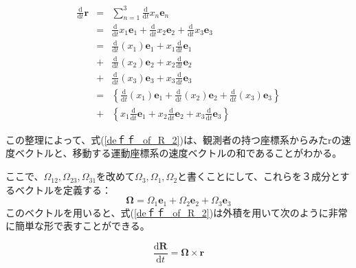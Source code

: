 \documentclass[twocolumn,a4j,10pt]{jarticle}
\begin{document}
\begin{eqnarray}
  \frac{\mathrm{d}}{\mathrm{d} t} \bm{r} &=& \sum_{n=1}^{3} \frac{\mathrm{d}}{\mathrm{d} t} x_n \bm{e}_n \nonumber \\
  &=& \frac{\mathrm{d}}{\mathrm{d} t} x_1 \bm{e}_1
      + \frac{\mathrm{d}}{\mathrm{d} t} x_2 \bm{e}_2
      + \frac{\mathrm{d}}{\mathrm{d} t} x_3 \bm{e}_3 \nonumber \\
  &=& \frac{\mathrm{d}}{\mathrm{d} t} (x_1) \bm{e}_1 + x_1 \frac{\mathrm{d}}{\mathrm{d} t} \bm{e}_1 \nonumber \\
  &+& \frac{\mathrm{d}}{\mathrm{d} t} (x_2) \bm{e}_2 + x_2 \frac{\mathrm{d}}{\mathrm{d} t} \bm{e}_2 \nonumber \\
  &+& \frac{\mathrm{d}}{\mathrm{d} t} (x_3) \bm{e}_3 + x_3 \frac{\mathrm{d}}{\mathrm{d} t} \bm{e}_3 \nonumber \\
  &=& \left\{ \frac{\mathrm{d}}{\mathrm{d} t} (x_1) \bm{e}_1 + \frac{\mathrm{d}}{\mathrm{d} t} (x_2) \bm{e}_2 + \frac{\mathrm{d}}{\mathrm{d} t} (x_3) \bm{e}_3 \right\} \nonumber \\
  &+& \left\{ x_1 \frac{\mathrm{d}}{\mathrm{d} t} \bm{e}_1 + x_2 \frac{\mathrm{d}}{\mathrm{d} t} \bm{e}_2 + x_3 \frac{\mathrm{d}}{\mathrm{d} t} \bm{e}_3 \right\}
  \label{deｆｆ_of_R_2}
\end{eqnarray}

この整理によって、式(\ref{deｆｆ_of_R_2})は、観測者の持つ座標系からみたrの速度ベクトルと、移動する運動座標系の速度ベクトルの和であることがわかる。

ここで、$\Omega_{12},\Omega_{23},\Omega_{31}$を改めて$\Omega_{3},\Omega_{1},\Omega_{2}$と書くことにして、これらを３成分とするベクトルを定義する：
\begin{equation}
  \bm{\Omega} = \Omega_1 \bm{e}_1 + \Omega_2 \bm{e}_2 + \Omega_3 \bm{e}_3
  \label{angular_speed}
\end{equation}
このベクトルを用いると、式(\ref{deｆｆ_of_R_2})は外積を用いて次のように非常に簡単な形で表すことができる。

\begin{equation}
  \frac{\mathrm{d} \bm{R}}{\mathrm{d} t} = \bm{\Omega} \times \bm{r}
  \label{angular_speed}
\end{equation}
\end{document}
